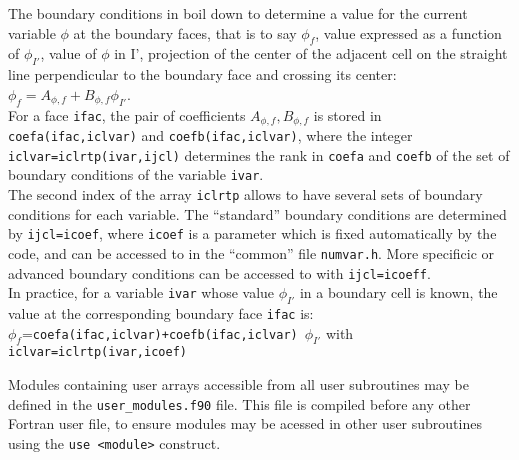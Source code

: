 {{{



The boundary conditions in \CS boil down to determine a value for the
current variable $\phi$ at the boundary faces, that is to say $\phi_f$,
value expressed as a function of $\phi_{I'}$, value of $\phi$ in I',
projection of the center of the adjacent cell on the straight line
perpendicular to the boundary face and crossing its center:
$\phi_f=A_{\phi,f}+B_{\phi,f}\phi_{I'}$.  \\
For a face \texttt{ifac}, the pair of coefficients $A_{\phi,f},B_{\phi,f}$ is
stored in \texttt{coefa(ifac,iclvar)} and
\texttt{coefb(ifac,iclvar)}, where the integer \texttt{iclvar=iclrtp(ivar,ijcl)}
determines the rank in \texttt{coefa} and \texttt{coefb} of the set of boundary
conditions of the variable \texttt{ivar}. \\
The second index of the array \texttt{iclrtp} allows to have several sets of
boundary conditions for each variable. The ``standard'' boundary
conditions are determined by \texttt{ijcl=icoef}, where \texttt{icoef} is a
parameter which is fixed automatically by the code, and can be accessed to in the
``common'' file \texttt{numvar.h}. More specificic or advanced boundary
conditions can be accessed to with \texttt{ijcl=icoeff}. \\
In practice, for a variable \texttt{ivar} whose value $\phi_{I'}$ in a
boundary cell is known, the value at the corresponding boundary face
\texttt{ifac} is: \\
\mbox{$\phi_f$=\texttt{coefa(ifac,iclvar)+coefb(ifac,iclvar)} $\phi_{I'}$}
with \texttt{iclvar=iclrtp(ivar,icoef)}

Modules containing user arrays accessible from all user subroutines may
be defined in the \texttt{user\_modules.f90} file. This file is
compiled before any other Fortran user file, to ensure modules
may be acessed in other user subroutines using the \texttt{use <module>}
construct.

}}}
